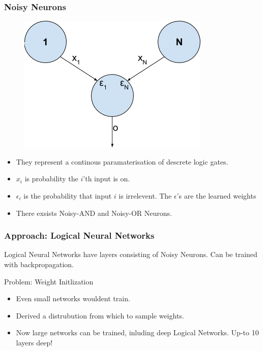 \documentclass{beamer}
\begin{document}
\begin{frame}
\frametitle{Noisy Neurons}

\begin{figure}
\centering
	\begin{minipage}[b]{0.4\textwidth}
		\includegraphics[width=\textwidth]{Images/NoisyNeuronEG.png}
	\end{minipage}
	\hfill
\end{figure}

\begin{itemize}
\item They represent a continous paramaterisation of descrete logic gates.
\item $x_i$ is probability the $i$'th input is on.
\item $\epsilon_i$ is the probability that input $i$ is irrelevent. The $\epsilon$'s are the learned weights
\item There exsists Noisy-AND and Noisy-OR Neurons.
\end{itemize}


\end{frame}

\begin{frame}
\frametitle{Approach: Logical Neural Networks}
Logical Neural Networks have layers consisting of Noisy Neurons. Can be trained with backpropagation.

\begin{block}{Problem: Weight Initlization}
\begin{itemize}
\item Even small networks wouldent train.
\item Derived a distrubution from which to sample weights.
\item Now large networks can be trained, inluding deep Logical Networks. Up-to 10 layers deep!
\end{itemize}
\end{block}

\end{frame}
\end{document}
